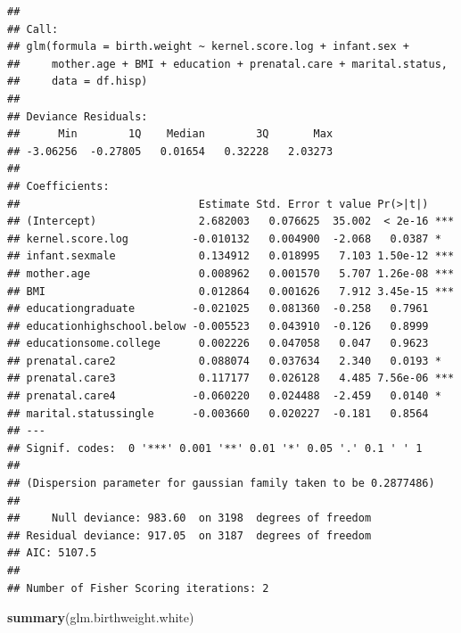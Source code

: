 \documentclass[
  12pt,
]{article}
\newenvironment{Shaded}{\begin{snugshade}}{\end{snugshade}}
\newcommand{\KeywordTok}[1]{\textcolor[rgb]{0.13,0.29,0.53}{\textbf{#1}}}
\newcommand{\NormalTok}[1]{#1}
\begin{document}
\begin{verbatim}
## 
## Call:
## glm(formula = birth.weight ~ kernel.score.log + infant.sex + 
##     mother.age + BMI + education + prenatal.care + marital.status, 
##     data = df.hisp)
## 
## Deviance Residuals: 
##      Min        1Q    Median        3Q       Max  
## -3.06256  -0.27805   0.01654   0.32228   2.03273  
## 
## Coefficients:
##                            Estimate Std. Error t value Pr(>|t|)    
## (Intercept)                2.682003   0.076625  35.002  < 2e-16 ***
## kernel.score.log          -0.010132   0.004900  -2.068   0.0387 *  
## infant.sexmale             0.134912   0.018995   7.103 1.50e-12 ***
## mother.age                 0.008962   0.001570   5.707 1.26e-08 ***
## BMI                        0.012864   0.001626   7.912 3.45e-15 ***
## educationgraduate         -0.021025   0.081360  -0.258   0.7961    
## educationhighschool.below -0.005523   0.043910  -0.126   0.8999    
## educationsome.college      0.002226   0.047058   0.047   0.9623    
## prenatal.care2             0.088074   0.037634   2.340   0.0193 *  
## prenatal.care3             0.117177   0.026128   4.485 7.56e-06 ***
## prenatal.care4            -0.060220   0.024488  -2.459   0.0140 *  
## marital.statussingle      -0.003660   0.020227  -0.181   0.8564    
## ---
## Signif. codes:  0 '***' 0.001 '**' 0.01 '*' 0.05 '.' 0.1 ' ' 1
## 
## (Dispersion parameter for gaussian family taken to be 0.2877486)
## 
##     Null deviance: 983.60  on 3198  degrees of freedom
## Residual deviance: 917.05  on 3187  degrees of freedom
## AIC: 5107.5
## 
## Number of Fisher Scoring iterations: 2
\end{verbatim}

\begin{Shaded}
\begin{Highlighting}[]
\KeywordTok{summary}\NormalTok{(glm.birthweight.white)}
\end{Highlighting}
\end{Shaded}
\end{document}
